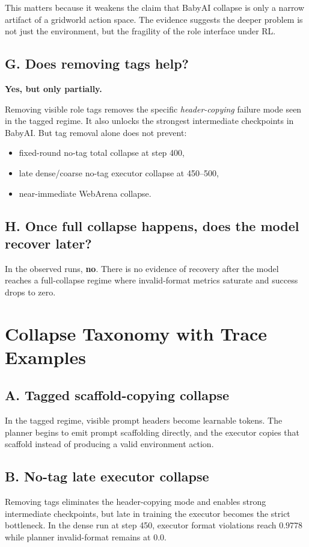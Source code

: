\documentclass{ieeeaccess}
\begin{document}
This matters because it weakens the claim that BabyAI collapse is only a narrow artifact of a gridworld action space. The evidence suggests the deeper problem is not just the environment, but the fragility of the role interface under RL.

\subsection{G. Does removing tags help?}
\textbf{Yes, but only partially.}

Removing visible role tags removes the specific \emph{header-copying} failure mode seen in the tagged regime. It also unlocks the strongest intermediate checkpoints in BabyAI. But tag removal alone does not prevent:
\begin{itemize}
\item fixed-round no-tag total collapse at step 400,
\item late dense/coarse no-tag executor collapse at 450--500,
\item near-immediate WebArena collapse.
\end{itemize}

\subsection{H. Once full collapse happens, does the model recover later?}
In the observed runs, \textbf{no}. There is no evidence of recovery after the model reaches a full-collapse regime where invalid-format metrics saturate and success drops to zero.

\section{Collapse Taxonomy with Trace Examples}
\subsection{A. Tagged scaffold-copying collapse}
In the tagged regime, visible prompt headers become learnable tokens. The planner begins to emit prompt scaffolding directly, and the executor copies that scaffold instead of producing a valid environment action.

\subsection{B. No-tag late executor collapse}
Removing tags eliminates the header-copying mode and enables strong intermediate checkpoints, but late in training the executor becomes the strict bottleneck. In the dense run at step 450, executor format violations reach $0.9778$ while planner invalid-format remains at $0.0$.
\end{document}
